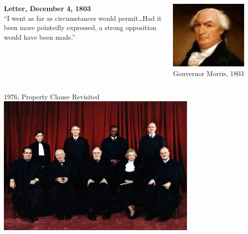 \begin{frame}
    \begin{columns}[onlytextwidth]
            \textbf{Letter, December 4, 1803} \\
            ``I went as far as circumstances would permit\ldots Had it been
            more pointedly expressed, a strong opposition would have been made.''

            \centering
            \includegraphics[width=0.95\textwidth]{img/morris-portrait.png} \\
            Gouvernor Morris, 1803 \\
    \end{columns}
\end{frame}

\begin{frame}{1976, Property Clause Revisited}
    \centering
    \includegraphics[width=0.75\textwidth]{img/sc-1976.png} \\
\end{frame}

